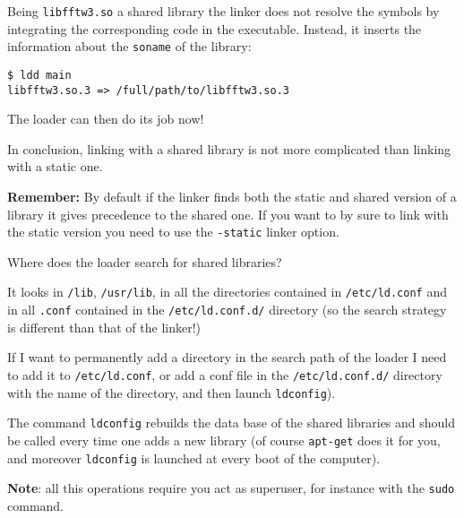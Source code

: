 \documentclass[10pt]{beamer}
\begin{document}
\begin{frame}[fragile]

Being \texttt{libfftw3.so} a shared library the linker does not
resolve the symbols by integrating the corresponding code in the
executable. Instead, it inserts the information about the
\texttt{soname} of the library:
\smallskip

\begin{verbatim}
$ ldd main
libfftw3.so.3 => /full/path/to/libfftw3.so.3
\end{verbatim}
\smallskip
The loader can then do its job now!
\smallskip

In conclusion, linking with a shared library is not more complicated
than linking with a static one.
\medskip

\textbf{Remember:} By default if the linker finds both the static and
shared version of a library it gives precedence to the shared
one. If you want to by sure to link with the static version you need to use 
the \texttt{-static} linker option.
\end{frame}

\begin{frame}{Where does the loader search for shared libraries?}  

It looks in \texttt{/lib}, \texttt{/usr/lib}, in all the
directories contained in \texttt{/etc/ld.conf} and in all \texttt{.conf} contained in the \texttt{/etc/ld.conf.d/}
directory (so the search strategy is different than that of the
linker!) \smallskip

If I want to permanently add a directory in the search path of the
loader I need to add it to \texttt{/etc/ld.conf}, or add a conf file
in the \texttt{/etc/ld.conf.d/} directory with the name of the
directory, and then launch \texttt{ldconfig}).  \smallskip

The command \texttt{ldconfig} rebuilds the data base of the shared
libraries and should be called every time one adds a new library (of
course \texttt{apt-get} does it for you, and moreover
\texttt{ldconfig} is launched at every boot of the computer).
\smallskip

\textbf{Note}: all this operations require you act as superuser, for
instance with the \texttt{sudo} command.
\end{frame}
\end{document}
